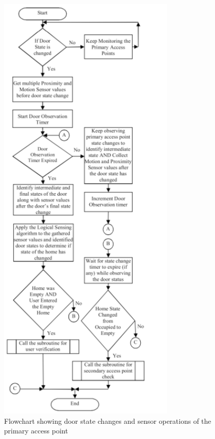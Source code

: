 \begin{appendices}
    \begin{figure}[!ht]
        \begin{adjustbox}{width=\linewidth, totalheight=\dimexpr\textheight-1.2in\relax, keepaspectratio}
            \includegraphics{datasets/images/A2} %
        \end{adjustbox}
        \caption{Flowchart showing door state changes and sensor operations of the primary access point}
        \label{fig:figure5}
    \end{figure}

    \cleardoublepage



\end{appendices}
